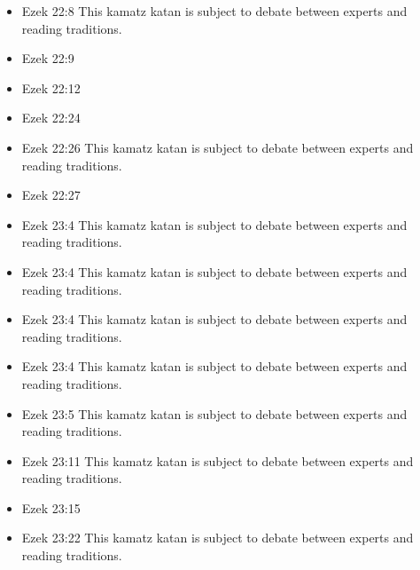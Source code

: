 \documentclass[14pt]{article}
\begin{document}
\begin{multicols}{2}
\begin{itemize}
												\item Ezek 22:8 This kamatz katan is subject to debate between experts and reading traditions.
												
												\item Ezek 22:9
												
												\item Ezek 22:12
												
												\item Ezek 22:24
												
												\item Ezek 22:26 This kamatz katan is subject to debate between experts and reading traditions.
												
												\item Ezek 22:27
												
												\item Ezek 23:4 This kamatz katan is subject to debate between experts and reading traditions.
												
												\item Ezek 23:4 This kamatz katan is subject to debate between experts and reading traditions.
												
												\item Ezek 23:4 This kamatz katan is subject to debate between experts and reading traditions.
												
												\item Ezek 23:4 This kamatz katan is subject to debate between experts and reading traditions.
												
												\item Ezek 23:5 This kamatz katan is subject to debate between experts and reading traditions.
												
												\item Ezek 23:11 This kamatz katan is subject to debate between experts and reading traditions.
												
												\item Ezek 23:15
												
												\item Ezek 23:22 This kamatz katan is subject to debate between experts and reading traditions.
												

\end{itemize}
\end{multicols}
\end{document}
